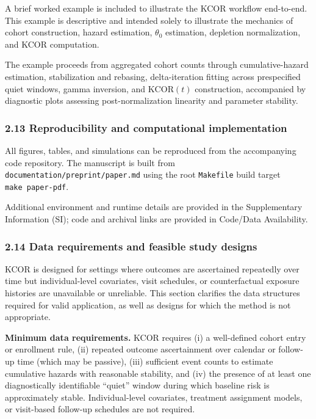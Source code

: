 \documentclass[
]{article}
\begin{document}
A brief worked example is included to illustrate the KCOR workflow
end-to-end. This example is descriptive and intended solely to
illustrate the mechanics of cohort construction, hazard estimation,
\(\theta_0\) estimation, depletion normalization, and KCOR computation.

The example proceeds from aggregated cohort counts through
cumulative-hazard estimation, stabilization and rebasing,
delta-iteration fitting across prespecified quiet windows, gamma
inversion, and \(\mathrm{KCOR}(t)\) construction, accompanied by
diagnostic plots assessing post-normalization linearity and parameter
stability.

\subsubsection{2.13 Reproducibility and computational
implementation}\label{reproducibility-and-computational-implementation}

All figures, tables, and simulations can be reproduced from the
accompanying code repository. The manuscript is built from
\texttt{documentation/preprint/paper.md} using the root
\texttt{Makefile} build target \texttt{make\ paper-pdf}.

Additional environment and runtime details are provided in the
Supplementary Information (SI); code and archival links are provided in
Code/Data Availability.

\subsubsection{2.14 Data requirements and feasible study
designs}\label{data-requirements-and-feasible-study-designs}

KCOR is designed for settings where outcomes are ascertained repeatedly
over time but individual-level covariates, visit schedules, or
counterfactual exposure histories are unavailable or unreliable. This
section clarifies the data structures required for valid application, as
well as designs for which the method is not appropriate.

\textbf{Minimum data requirements.} KCOR requires (i) a well-defined
cohort entry or enrollment rule, (ii) repeated outcome ascertainment
over calendar or follow-up time (which may be passive), (iii) sufficient
event counts to estimate cumulative hazards with reasonable stability,
and (iv) the presence of at least one diagnostically identifiable
``quiet'' window during which baseline risk is approximately stable.
Individual-level covariates, treatment assignment models, or visit-based
follow-up schedules are not required.
\end{document}

